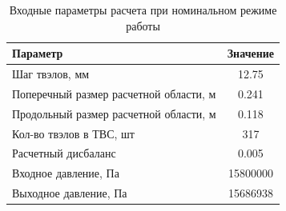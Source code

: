\begin{table}[H]
    \caption{Входные параметры расчета при номинальном режиме работы}
    \begin{center}
        \begin{tabular}{|l|c|}
        \toprule
        Параметр & Значение \\
        \midrule
        \hline
        Шаг твэлов, мм & 12.75 \\ 
        \hline
        Поперечный размер расчетной области, м & 0.241 \\
        \hline
        Продольный размер расчетной области, м & 0.118 \\
        \hline
        Кол-во твэлов в ТВС, шт & 317 \\
        \hline
        Расчетный дисбаланс & 0.005 \\
        \hline
        Входное давление, Па & 15800000 \\
        \hline
        Выходное давление, Па & 15686938 \\
        \bottomrule
        \end{tabular}
		\label{tabular:thehyco_nominal}
    \end{center}
\end{table}



